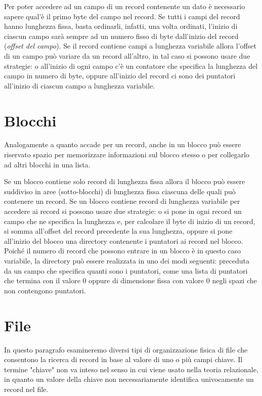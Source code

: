 Per poter accedere ad un campo di un record contenente un dato è necessario sapere qual'è il primo byte del campo nel record. Se tutti i campi del record hanno lunghezza fissa, basta ordinarli, infatti, una volta ordinati, l'inizio di ciascun campo sarà sempre ad un numero fisso di byte dall'inizio del record (\textit{offset del campo}). Se il record contiene campi a lunghezza variabile allora l'offset di un campo può variare da un record all'altro, in tal caso si possono usare due strategie: o all'inizio di ogni campo c'è un contatore che specifica la lunghezza del campo in numero
di byte, oppure all'inizio del record ci sono dei puntatori all'inizio di ciascun campo a lunghezza variabile.

\section{Blocchi}
Analogamente a quanto accade per un record, anche in un blocco può essere riservato spazio per memorizzare informazioni sul blocco stesso o per collegarlo ad altri blocchi in una lista.

Se un blocco contiene solo record di lunghezza fissa allora il blocco può essere suddiviso in aree (sotto-blocchi) di lunghezza fissa ciascuna delle quali può contenere un record. Se un blocco contiene record di lunghezza variabile per accedere ai record si possono usare due strategie: o si pone in ogni record un campo che ne specifica la lunghezza e, per calcolare il byte di inizio di un record, si somma all'offset del record precedente la sua lunghezza, oppure si pone all'inizio del blocco una directory contenente i puntatori ai record nel blocco. Poiché il numero di record che possono entrare in un blocco è in questo caso variabile, la directory può essere realizzata in uno dei modi seguenti: preceduta da un campo che specifica quanti sono i puntatori, come una lista di puntatori che termina con il valore 0 oppure di dimensione fissa con valore 0 negli spazi che non contengono puntatori.

\section{File}
In questo paragrafo esamineremo diversi tipi di organizzazione fisica di file che consentono la ricerca di record in base al valore di uno o più campi chiave. Il termine "chiave" non va inteso nel senso in cui viene usato nella teoria relazionale, in quanto un valore della chiave non necessariamente identifica univocamente un record nel file. 

